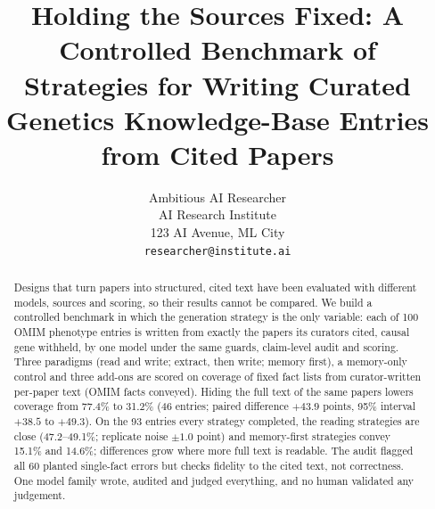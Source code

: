 \documentclass{article} %
\title{Holding the Sources Fixed: A Controlled Benchmark of Strategies for Writing Curated Genetics Knowledge-Base Entries from Cited Papers}
\author{Ambitious AI Researcher\\
AI Research Institute\\
123 AI Avenue, ML City\\
\texttt{researcher@institute.ai}
}
\begin{document}
\maketitle

\begin{abstract}
Designs that turn papers into structured, cited text have been evaluated with different models, sources and scoring, so their results cannot be compared. We build a controlled benchmark in which the generation strategy is the only variable: each of 100 OMIM phenotype entries is written from exactly the papers its curators cited, causal gene withheld, by one model under the same guards, claim-level audit and scoring. Three paradigms (read and write; extract, then write; memory first), a memory-only control and three add-ons are scored on coverage of fixed fact lists from curator-written per-paper text (OMIM facts conveyed). Hiding the full text of the same papers lowers coverage from 77.4\% to 31.2\% (46 entries; paired difference $+43.9$ points, 95\% interval $+38.5$ to $+49.3$). On the 93 entries every strategy completed, the reading strategies are close (47.2--49.1\%; replicate noise $\pm1.0$ point) and memory-first strategies convey 15.1\% and 14.6\%; differences grow where more full text is readable. The audit flagged all 60 planted single-fact errors but checks fidelity to the cited text, not correctness. One model family wrote, audited and judged everything, and no human validated any judgement.
\end{abstract}
\end{document}
